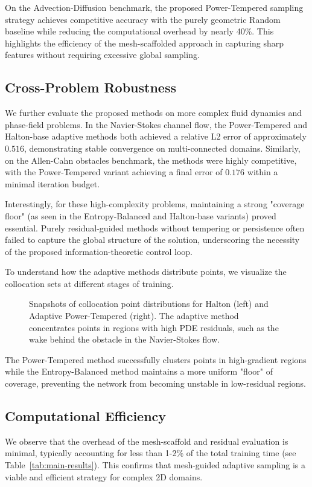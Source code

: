 On the Advection-Diffusion benchmark, the proposed Power-Tempered sampling strategy achieves competitive accuracy with the purely geometric Random baseline while reducing the computational overhead by nearly 40\%. This highlights the efficiency of the mesh-scaffolded approach in capturing sharp features without requiring excessive global sampling.

\subsection{Cross-Problem Robustness}

We further evaluate the proposed methods on more complex fluid dynamics and phase-field problems. In the Navier-Stokes channel flow, the Power-Tempered and Halton-base adaptive methods both achieved a relative L2 error of approximately $0.516$, demonstrating stable convergence on multi-connected domains. Similarly, on the Allen-Cahn obstacles benchmark, the methods were highly competitive, with the Power-Tempered variant achieving a final error of $0.176$ within a minimal iteration budget.

Interestingly, for these high-complexity problems, maintaining a strong "coverage floor" (as seen in the Entropy-Balanced and Halton-base variants) proved essential. Purely residual-guided methods without tempering or persistence often failed to capture the global structure of the solution, underscoring the necessity of the proposed information-theoretic control loop.

To understand how the adaptive methods distribute points, we visualize the collocation sets at different stages of training.

\begin{figure}[htbp]
    \centering
    \caption{Snapshots of collocation point distributions for Halton (left) and Adaptive Power-Tempered (right). The adaptive method concentrates points in regions with high PDE residuals, such as the wake behind the obstacle in the Navier-Stokes flow.}
    \label{fig:snapshots}
\end{figure}

The Power-Tempered method successfully clusters points in high-gradient regions while the Entropy-Balanced method maintains a more uniform "floor" of coverage, preventing the network from becoming unstable in low-residual regions.

\subsection{Computational Efficiency}

We observe that the overhead of the mesh-scaffold and residual evaluation is minimal, typically accounting for less than 1-2\% of the total training time (see Table~\ref{tab:main-results}). This confirms that mesh-guided adaptive sampling is a viable and efficient strategy for complex 2D domains.
